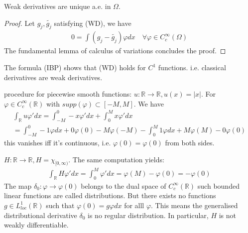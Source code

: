 \begin{lemma}
	Weak derivatives are unique a.e. in $\Omega$. 
\end{lemma}
\begin{proof}
	Let $g_j, \tilde{g_j}$ satisfying (WD), we have
	\begin{align*}
		0 = \int (g_j - \tilde{g_j}) \varphi dx \quad \forall \varphi \in C_c^\infty(\Omega)
	\end{align*}
	The fundamental lemma of calculus of variations concludes the proof. 
\end{proof}

The formula (IBP) shows that (WD) holds for $C^1$ functions. i.e. classical derivatives are weak derivatives. 


\begin{example}[1-D example]
procedure for piecewise smooth functions: $u: \mathbb{R} \rightarrow \mathbb{R}, u(x) = |x|$. For $\varphi \in C_c^\infty(\mathbb{R})$ with $supp(\varphi) \subset [-M, M]$. We have
\begin{align*}
	\int_\mathbb{R} u \varphi' dx = \int_{-M}^0 -x \varphi'dx + \int_0^M x \varphi'dx \\
	= \int_{-M}^0 -1 \varphi dx + 0 \varphi(0) - M \varphi(-M) - \int_0^M 1 \varphi dx + M \varphi(M) - 0\varphi(0)
\end{align*}	
this vanishes iff it's continuous, i.e. $\varphi(0) = \varphi(0)$ from both sides.
\end{example}

\begin{example}
$H: \mathbb{R} \rightarrow \mathbb{R}, H = \chi_{[0, \infty)}$. The same computation yields:
\begin{align*}
	\int_\mathbb{R} H \varphi'dx = \int_0^M \varphi' dx = \varphi(M) - \varphi(0) = - \varphi(0)
\end{align*}	
The map $\delta_0: \varphi \rightarrow \varphi(0)$ belongs to the dual space of $C_c^\infty(\mathbb{R})$ such bounded linear functions are called distributions. But there exists no functions $g \in L_{loc}^1(\mathbb{R})$ such that $\varphi(0) = g \varphi dx$ for alll $\varphi$. This means the generalised distributional derivative $\delta_0$ is no regular distribution. In particular, $H$ is not weakly differentiable. 
\end{example}

